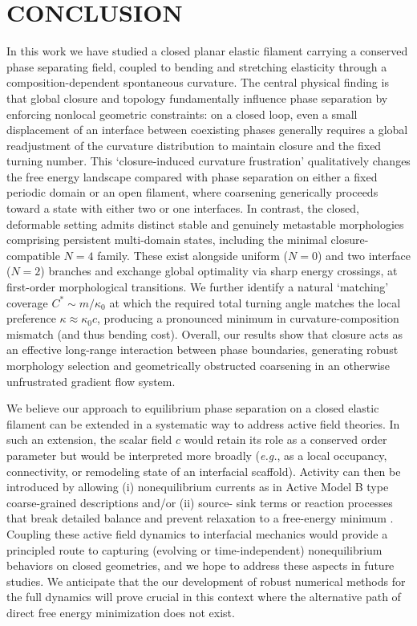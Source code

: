 \documentclass[
aip,
jcp,
reprint, 
floatfix
]{revtex4-1}
\begin{document}
\section{CONCLUSION}  \label{sec: outlook}
In this work we have studied a closed planar elastic filament carrying a conserved phase separating field, coupled to bending and stretching elasticity through a composition-dependent spontaneous curvature. The central physical finding is that global closure and topology fundamentally influence phase separation by enforcing nonlocal geometric constraints: on a closed loop, even a small displacement of an interface between coexisting phases generally requires a global readjustment of the curvature distribution to maintain closure and the fixed turning number. This `closure-induced curvature frustration' qualitatively changes the free energy landscape compared with phase separation on either a fixed periodic domain or an open filament, where coarsening generically proceeds toward a state with either two or one interfaces. In contrast, the closed, deformable setting admits distinct stable and genuinely metastable morphologies comprising persistent multi-domain states, including the minimal closure-compatible $N=4$ family. These exist alongside uniform ($N=0$) and two interface ($N=2$) branches and exchange global optimality via sharp energy crossings, at first-order morphological transitions. We further identify a natural `matching' coverage $C^* \sim m / \kappa_0$ at which the required total turning angle matches the local preference $\kappa \approx \kappa_0 c$, producing a pronounced minimum in curvature-composition mismatch (and thus bending cost). Overall, our results show that closure acts as an effective long-range interaction between phase boundaries, generating robust morphology selection and geometrically obstructed coarsening in an otherwise unfrustrated gradient flow system.

We believe our approach to equilibrium phase separation on a closed elastic filament can be extended in a systematic way to address active field theories. In such an extension, the scalar field $c$ would retain its role as a conserved order parameter but would be interpreted more broadly ({\em e.g.}, as a local occupancy, connectivity, or remodeling state of an interfacial scaffold). Activity can then be introduced by allowing (i) nonequilibrium currents as in Active Model B type coarse-grained descriptions \cite{wittkowski2014scalar, nardini2017entropy} and/or (ii) source-  sink terms or reaction processes that break detailed balance and prevent relaxation to a free-energy minimum \cite{GoychukFrey2019, gao2026self}. Coupling these active field dynamics to interfacial mechanics would provide a principled route to capturing (evolving or time-independent) nonequilibrium behaviors on closed geometries, and we hope to address these aspects in future studies. We anticipate that the our development of robust numerical methods for the full dynamics will prove crucial in this context where the alternative path of direct free energy minimization does not exist.
\end{document}

